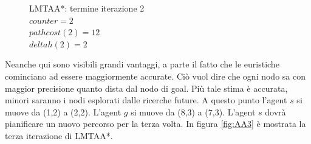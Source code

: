 \documentclass[11pt]{book}
\begin{document}
\begin{figure}[H]
\caption[caption]{LMTAA*: termine iterazione 2\\\hspace{\textwidth}$counter = 2$\\\hspace{\textwidth}$pathcost(2) = 12$\\\hspace{\textwidth}$deltah(2) = 2$} \label{fig:AA2}
\end{figure}

\par{Neanche qui sono visibili grandi vantaggi, a parte il fatto che le euristiche cominciano ad essere maggiormente accurate. Ci\`o vuol dire che ogni nodo sa con maggior precisione quanto dista dal nodo di goal. Pi\`u tale stima \`e accurata, minori saranno i nodi esplorati dalle ricerche future. A questo punto l'agent $s$ si muove da (1,2) a (2,2). L'agent $g$ si muove da (8,3) a (7,3). L'agent $s$ dovr\`a pianificare un nuovo percorso per la terza volta. In figura \ref{fig:AA3} \`e mostrata la terza iterazione di LMTAA*.}
\end{document}
